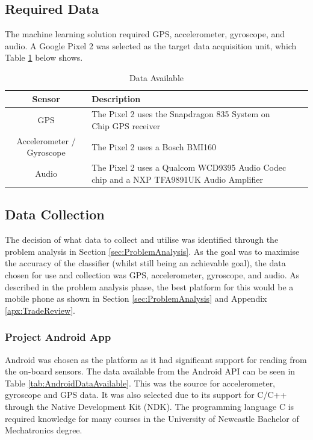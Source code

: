 \documentclass{UoNMCHA}
\newcommand{\sref}[1] {Section \ref{#1}}
\newcommand{\tref}[1] {Table \ref{#1}}
\newcommand{\aref}[1] {Appendix \ref{#1}}
\numberwithin{equation}{section}
\begin{document}
\subsection{Required Data}
The machine learning solution required GPS, accelerometer, gyroscope, and audio. A Google Pixel 2 was selected as the target data acquisition unit, which \tref{tab:AndroidSensorsAvailable} below shows.
\begin{table}[h!] 
    \begin{center}
        \caption{Data Available \cite{pixelteardown}}\label{tab:AndroidSensorsAvailable}
        {\footnotesize
            \begin{tabular}{clll}
                \hline\hline Sensor & Description \\ \hline 
                GPS & The Pixel 2 uses the Snapdragon 835 System on Chip GPS receiver\\
                Accelerometer / Gyroscope & The Pixel 2 uses a Bosch BMI160 \\
                Audio & The Pixel 2 uses a Qualcom WCD9395 Audio Codec chip and a NXP TFA9891UK Audio Amplifier \\ \hline
            \end{tabular}
        }
    \end{center}
\end{table}

\subsection{Data Collection}

The decision of what data to collect and utilise was identified through the problem analysis in \sref{sec:ProblemAnalysis}. As the goal was to maximise the accuracy of the classifier (whilst still being an achievable goal), the data chosen for use and collection was GPS, accelerometer, gyroscope, and audio. As described in the problem analysis phase, the best platform for this would be a mobile phone as shown in \sref{sec:ProblemAnalysis} and \aref{apx:TradeReview}. 

\subsubsection{Project Android App}
Android was chosen as the platform as it had significant support for reading from the on-board sensors. The data available from the Android API can be seen in \tref{tab:AndroidDataAvailable}. This was the source for accelerometer, gyroscope and GPS data. It was also selected due to its support for C/C++ through the Native Development Kit (NDK). The programming language C is required knowledge for many courses in the University of Newcastle Bachelor of Mechatronics degree. 
\end{document}
